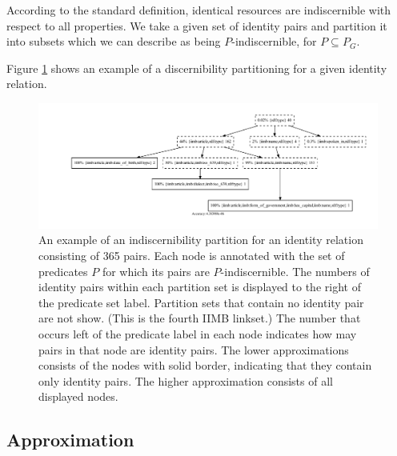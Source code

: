 \documentclass[letterpaper]{article}
\begin{document}

According to the standard definition, identical resources are indiscernible with respect to all properties. We take a given set of identity pairs and partition it into subsets which we can describe as being $P$-indiscernible, for $P \subseteq P_G$.

Figure \ref{fig:iimb_example} shows an example of a discernibility partitioning for a given identity relation.

\begin{figure}
\label{fig:iimb_example}
\centering
\includegraphics[width=\textwidth]{iimb_approximation_example}
\caption{An example of an indiscernibility partition for an identity relation consisting of 365 pairs. Each node is annotated with the set of predicates $P$ for which its pairs are $P$-indiscernible. The numbers of identity pairs within each partition set is displayed to the right of the predicate set label. Partition sets that contain no identity pair are not show. (This is the fourth IIMB linkset.) The number that occurs left of the predicate label in each node indicates how may pairs in that node are identity pairs. The lower approximations consists of the nodes with solid border, indicating that they contain only identity pairs. The higher approximation consists of all displayed nodes.}
\end{figure}

\subsection{Approximation}
\label{sec:approximation}
\end{document}
